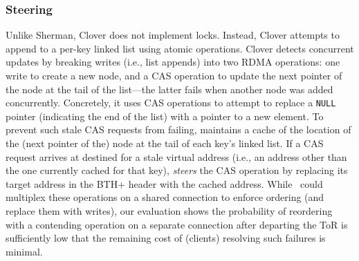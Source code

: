 \subsubsection{Steering}
\label{sec:steering}
Unlike Sherman, Clover does not implement locks.  Instead, Clover
attempts to append to a per-key linked list using atomic operations.
Clover detects concurrent updates by breaking writes (i.e., list
appends) into two RDMA operations: one write to create a new node, and
a CAS operation to update the next pointer of the node at the tail of
the list---the latter fails when another node was added concurrently.
Concretely, it uses CAS operations to attempt to replace a
\texttt{NULL} pointer (indicating the end of the list) with a pointer
to a new element.  To prevent such stale CAS requests from failing,
{\sword} maintains a cache of the location of the (next pointer of
the) node at the tail of each key's linked list. If a CAS request
arrives at {\sword} destined for a stale virtual address (i.e., an
address other than the one currently cached for that key), {\sword}
\emph{steers} the CAS operation by replacing its target address in the
BTH+ header with the cached address.
While \sword\ could multiplex these operations on a shared connection
to enforce ordering (and replace them with writes), our evaluation
shows the probability of reordering with a contending operation on a
separate connection after departing the ToR is sufficiently low that
the remaining cost of (clients) resolving such failures is minimal.





